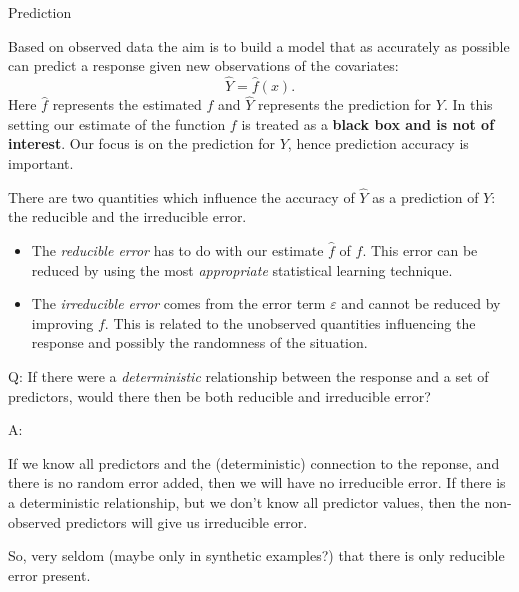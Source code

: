 \documentclass[ignorenonframetext,]{beamer}
\providecommand{\tightlist}{%
  \setlength{\itemsep}{0pt}\setlength{\parskip}{0pt}}
\begin{document}
\begin{frame}

\begin{block}{Prediction}

Based on observed data the aim is to build a model that as accurately as
possible can predict a response given new observations of the
covariates: \[\hat{Y} = \hat{f}(x).\] Here \(\hat{f}\) represents the
estimated \(f\) and \(\hat{Y}\) represents the prediction for \(Y\). In
this setting our estimate of the function \(f\) is treated as a
\textbf{black box and is not of interest}. Our focus is on the
prediction for \(Y\), hence prediction accuracy is important.

\end{block}

\end{frame}

\begin{frame}

There are two quantities which influence the accuracy of \(\hat{Y}\) as
a prediction of \(Y\): the reducible and the irreducible error.

\begin{itemize}
\tightlist
\item
  The \emph{reducible error} has to do with our estimate \(\hat{f}\) of
  \(f\). This error can be reduced by using the most \emph{appropriate}
  statistical learning technique.
\item
  The \emph{irreducible error} comes from the error term \(\varepsilon\)
  and cannot be reduced by improving \(f\). This is related to the
  unobserved quantities influencing the response and possibly the
  randomness of the situation.
\end{itemize}

\begin{block}{Q: If there were a \emph{deterministic} relationship
between the response and a set of predictors, would there then be both
reducible and irreducible error?}

\end{block}

\end{frame}

\begin{frame}

\begin{block}{A:}

If we know all predictors and the (deterministic) connection to the
reponse, and there is no random error added, then we will have no
irreducible error. If there is a deterministic relationship, but we
don't know all predictor values, then the non-observed predictors will
give us irreducible error.

So, very seldom (maybe only in synthetic examples?) that there is only
reducible error present.

\end{block}

\end{frame}
\end{document}
